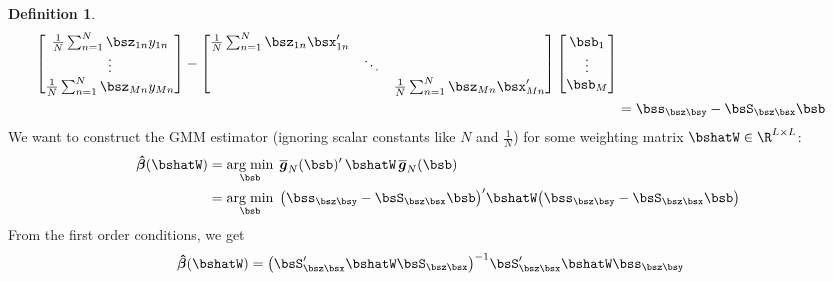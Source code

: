 \documentclass[12pt]{article}
\theoremstyle{plain}
\theoremstyle{definition}
\newtheorem{defn}[thm]{Definition}
\theoremstyle{remark}
\newcommand{\bshatbeta}{\boldsymbol{\hat{\beta}}}
\newcommand{\bsbarg}{\boldsymbol{\overline{g}}}
\DeclareMathOperator*{\argmin}{arg\;min}
\newcommand{\sumnN}{\sum^N_{n=1}}
\begin{document}
\begin{defn}
\begin{align*}
\begin{bmatrix}
    \frac{1}{N}\sumnN \bsz_{1n}y_{1n} \\
    \vdots\\
    \frac{1}{N}\sumnN\bsz_{Mn}y_{Mn} \\
  \end{bmatrix}
  -
  \begin{bmatrix}
    \frac{1}{N}\sumnN\bsz_{1n}\bsx_{1n}' &  &\\
    & \ddots & \\
    && \frac{1}{N}\sumnN\bsz_{Mn}\bsx_{Mn}' \\
  \end{bmatrix}
  \begin{bmatrix}
    \bsb_1 \\
    \vdots \\
    \bsb_M \\
  \end{bmatrix} \\
  &= \bss_{\bsz\bsy} - \bsS_{\bsz\bsx}\bsb
\end{align*}
We want to construct the GMM estimator (ignoring scalar constants like
$N$ and $\frac{1}{N}$) for some weighting matrix
$\bshatW\in \R^{L\times L}$:
\begin{align*}
  \bshatbeta(\bshatW)
  &= \argmin_{\bsb} \; \bsbarg_N(\bsb)' \, \bshatW \, \bsbarg_N(\bsb) \\
  &= \argmin_{\bsb} \;
    \big(\bss_{\bsz\bsy} - \bsS_{\bsz\bsx}\bsb\big)'
    \bshatW
    \big(\bss_{\bsz\bsy} - \bsS_{\bsz\bsx}\bsb\big)
\end{align*}
From the first order conditions, we get
\begin{align*}
  \bshatbeta(\bshatW) &=
  \big(\bsS_{\bsz\bsx}' \bshatW \bsS_{\bsz\bsx}\big)^{-1}
    \bsS_{\bsz\bsx}' \bshatW \bss_{\bsz\bsy}
\end{align*}
\end{defn}
\end{document}
